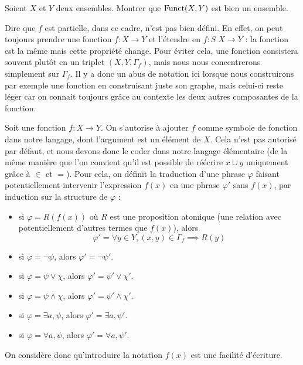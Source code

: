 \begin{exercise}
  Soient $X$ et $Y$ deux ensembles. Montrer que $\operatorname{Funct}(X,Y)$ est bien un
  ensemble.
\end{exercise}

\begin{remark}
  Dire que $f$ est partielle, dans ce cadre, n'est pas bien défini. En effet, on
  peut toujours prendre une fonction $f : X \to Y$ et l'étendre en
  $f : S\;X \to Y$ : la fonction est la même mais cette propriété change. Pour
  éviter cela, une fonction consistera souvent plutôt en un triplet
  $(X,Y,\Gamma_f)$, mais nous nous concentrerons simplement sur $\Gamma_f$. Il y
  a donc un abus de notation ici lorsque nous construirons par exemple une
  fonction en construisant juste son graphe, mais celui-ci reste léger car on
  connait toujours grâce au contexte les deux autres composantes de la fonction.
\end{remark}

\begin{notation}
  Soit une fonction $f : X \to Y$. On s'autorise à ajouter $f$ comme symbole de
  fonction dans notre langage, dont l'argument est un élément de $X$. Cela n'est
  pas autorisé par défaut, et nous devons donc le coder dans notre langage
  élémentaire (de la même manière que l'on convient qu'il est possible de
  réécrire $x\cup y$ uniquement grâce à $\in$ et $=$). Pour cela, on définit la
  traduction d'une phrase $\varphi$ faisant potentiellement intervenir
  l'expression $f(x)$ en une phrase $\varphi'$ sans $f(x)$, par induction sur
  la structure de $\varphi$ :
  \begin{itemize}
  \item si $\varphi = R(f(x))$ où $R$ est une proposition atomique (une relation
    avec potentiellement d'autres termes que $f(x)$), alors
    \[\varphi' = \forall y\in Y, (x,y)\in \Gamma_f \implies R(y)\]
  \item si $\varphi = \lnot \psi$, alors $\varphi' = \lnot \psi'$.
  \item si $\varphi = \psi \lor \chi$, alors $\varphi' = \psi'\lor \chi'$.
  \item si $\varphi = \psi \land \chi$, alors $\varphi' = \psi'\land \chi'$.
  \item si $\varphi = \exists a, \psi$, alors $\varphi' = \exists a, \psi'$.
  \item si $\varphi = \forall a, \psi$, alors $\varphi' = \forall a, \psi'$.
  \end{itemize}

  On considère donc qu'introduire la notation $f(x)$ est une facilité d'écriture.
\end{notation}

